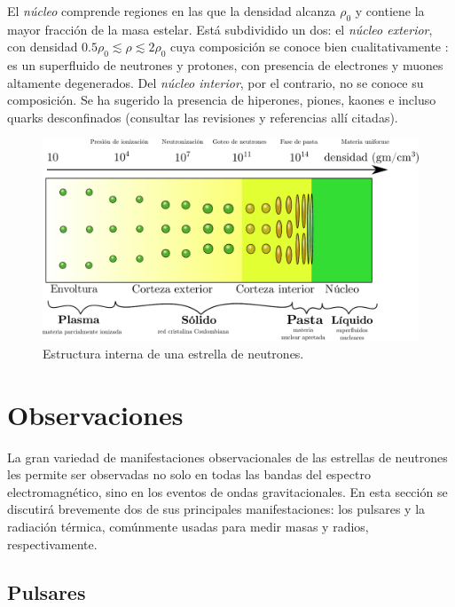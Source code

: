 El \emph{núcleo} comprende regiones en las que la densidad alcanza $\rho_0$ y contiene la mayor fracción de la masa estelar. Está subdividido un dos: el \emph{núcleo exterior}, con densidad $\num{0.5}\rho_0\lesssim\rho\lesssim 2\rho_0$  cuya composición se conoce bien cualitativamente \cite{Haensel2007}: es un superfluido de neutrones y protones, con presencia de electrones y muones altamente degenerados. Del \emph{núcleo interior}, por el contrario, no se conoce su composición. Se ha sugerido la presencia de hiperones, piones, kaones e incluso quarks desconfinados (consultar las revisiones \cite{Potekhin2010,Lattimer2004} y referencias allí citadas).



\begin{figure}[H]
    \centering
    \includegraphics[width=420pt]{figures/Density.pdf}
    \caption[Estructura interna de una estrella de neutrones]{Estructura interna de una estrella de neutrones.\protect\footnotemark}
    \label{NSS}
\end{figure}


\section{Observaciones}

La gran variedad de manifestaciones observacionales de las estrellas de neutrones les permite ser observadas no solo en todas las bandas del espectro electromagnético, sino en los eventos de ondas gravitacionales. En esta sección se discutirá brevemente dos de sus principales manifestaciones: los pulsares y la radiación térmica, comúnmente usadas para medir masas y radios, respectivamente.

\subsection{Pulsares}

